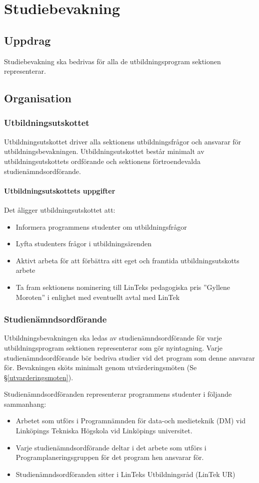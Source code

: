 \documentclass{datateknologsektionen-document}
\begin{document}
\section{Studiebevakning}
\subsection{Uppdrag}
Studiebevakning ska bedrivas för alla de utbildningsprogram sektionen representerar.
\subsection{Organisation}
\subsubsection{Utbildningsutskottet}
\label{utbu}
Utbildningsutskottet driver alla sektionens utbildningsfrågor och ansvarar för
utbildningsbevakningen. Utbildningsutskottet består minimalt av utbildningsutskottets
ordförande och sektionens förtroendevalda studienämndsordförande.
\paragraph{Utbildningsutskottets uppgifter}
Det åligger utbildningsutskottet att:
\begin{itemize}
  \item Informera programmens studenter om utbildningsfrågor
  \item Lyfta studenters frågor i utbildningsärenden
  \item Aktivt arbeta för att förbättra sitt eget och framtida utbildningsutskotts arbete
  \item Ta fram sektionens nominering till LinTeks pedagogiska pris ”Gyllene Moroten” i enlighet med eventuellt avtal med LinTek
\end{itemize}
\subsubsection{Studienämndsordförande}
\label{snordf}
Utbildningsbevakningen ska ledas av studienämndsordförande för varje utbildningsprogram
sektionen representerar som gör nyintagning. Varje studienämndsordförande bör bedriva
studier vid det program som denne ansvarar för. Bevakningen sköts minimalt genom
utvärderingsmöten (Se \S \ref{utvarderingsmoten}).

Studienämndsordföranden representerar programmens studenter i följande sammanhang:
\begin{itemize}
  \item Arbetet som utförs i Programnämnden för data-och medieteknik (DM) vid Linköpings Tekniska Högskola vid Linköpings universitet.
  \item Varje studienämndsordförande deltar i det arbete som utförs i Programplaneringsgruppen för det program hen ansvarar för.
  \item Studienämndsordföranden sitter i LinTeks Utbildningsråd (LinTek UR)
\end{itemize}
\end{document}
